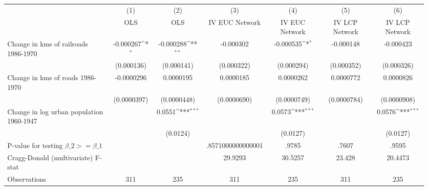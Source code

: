 {
\def\sym#1{\ifmmode^{#1}\else\(^{#1}\)\fi}
\begin{tabular}{l*{6}{c}}
\hline\hline
                &\multicolumn{1}{c}{(1)}&\multicolumn{1}{c}{(2)}&\multicolumn{1}{c}{(3)}&\multicolumn{1}{c}{(4)}&\multicolumn{1}{c}{(5)}&\multicolumn{1}{c}{(6)}\\
                &\multicolumn{1}{c}{OLS}&\multicolumn{1}{c}{OLS}&\multicolumn{1}{c}{IV EUC Network}&\multicolumn{1}{c}{IV EUC Network}&\multicolumn{1}{c}{IV LCP Network}&\multicolumn{1}{c}{IV LCP Network}\\
\hline
Change in kms of railroads 1986-1970&-0.000267\sym{*}  &-0.000288\sym{**} &-0.000302         &-0.000535\sym{*}  &-0.000148         &-0.000423         \\
                &(0.000136)         &(0.000141)         &(0.000322)         &(0.000294)         &(0.000352)         &(0.000326)         \\
[1em]
Change in kms of roads 1986-1970&-0.0000296         &0.0000195         &0.0000185         &0.0000262         &0.0000772         &0.0000826         \\
                &(0.0000397)         &(0.0000448)         &(0.0000690)         &(0.0000749)         &(0.0000784)         &(0.0000908)         \\
[1em]
Change in log urban population 1960-1947&                  &   0.0551\sym{***}&                  &   0.0573\sym{***}&                  &   0.0576\sym{***}\\
                &                  & (0.0124)         &                  & (0.0127)         &                  & (0.0127)         \\
\hline
P-value for testing $\beta\_{2} >= \beta\_{1}$&                  &                  &.8571000000000001         &    .9785         &    .7607         &    .9595         \\
Cragg-Donald (multivariate) F-stat&                  &                  &  29.9293         &  30.5257         &   23.428         &  20.4473         \\
Observations    &      311         &      235         &      311         &      235         &      311         &      235         \\
\hline\hline
\end{tabular}
}
